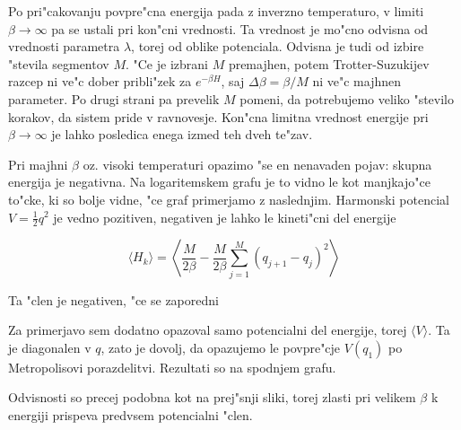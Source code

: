 \documentclass[a4paper,10pt]{article}
\begin{document}
Po pri"cakovanju povpre"cna energija pada z inverzno temperaturo, v limiti $\beta \to \infty$ pa se ustali pri kon"cni vrednosti. 
Ta vrednost je mo"cno odvisna od vrednosti parametra $\lambda$, torej od oblike potenciala. Odvisna je tudi od izbire "stevila segmentov $M$. 
"Ce je izbrani $M$ premajhen, potem Trotter-Suzukijev razcep ni ve"c dober pribli"zek za $e^{-\beta H}$, saj $\Delta\beta = \beta/M$ ni ve"c majhnen parameter. 
Po drugi strani pa prevelik $M$ pomeni, da potrebujemo veliko "stevilo korakov, da sistem pride v ravnovesje. 
Kon"cna limitna vrednost energije pri $\beta \to \infty$ je lahko posledica enega izmed teh dveh te"zav. 

Pri majhni $\beta$ oz. visoki temperaturi opazimo "se en nenavaden pojav: skupna energija je negativna. 
Na logaritemskem grafu je to vidno le kot manjkajo"ce to"cke, ki so bolje vidne, "ce graf primerjamo z naslednjim. 
Harmonski potencial $V=\frac{1}{2}q^2$ je vedno pozitiven, negativen je lahko le kineti"cni del energije

$$\langle H_k \rangle = \left\langle \frac{M}{2\beta} - \frac{M}{2\beta} \sum_{j=1}^{M}(q_{j+1} - q_j)^2 \right\rangle$$

Ta "clen je negativen, "ce se zaporedni

Za primerjavo sem dodatno opazoval samo potencialni del energije, torej $\langle V \rangle$. 
Ta je diagonalen v $q$, zato je dovolj, da opazujemo le povpre"cje $V(q_1)$ po Metropolisovi porazdelitvi. 
Rezultati so na spodnjem grafu. 

\begin{figure}[H]
 \centering
 
\end{figure}

Odvisnosti so precej podobna kot na prej"snji sliki, torej zlasti pri velikem $\beta$ k energiji prispeva predvsem potencialni "clen. 
\end{document}
